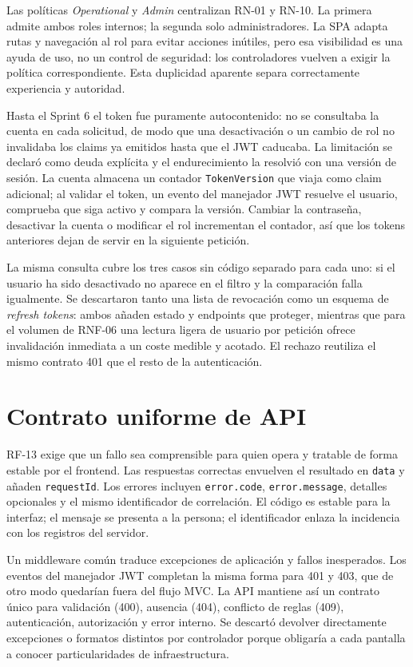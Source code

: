 Las políticas \emph{Operational} y \emph{Admin} centralizan RN-01 y RN-10. La primera admite ambos roles internos; la segunda solo administradores. La SPA adapta rutas y navegación al rol para evitar acciones inútiles, pero esa visibilidad es una ayuda de uso, no un control de seguridad: los controladores vuelven a exigir la política correspondiente. Esta duplicidad aparente separa correctamente experiencia y autoridad.

Hasta el Sprint 6 el token fue puramente autocontenido: no se consultaba la cuenta en cada solicitud, de modo que una desactivación o un cambio de rol no invalidaba los claims ya emitidos hasta que el JWT caducaba. La limitación se declaró como deuda explícita y el endurecimiento la resolvió con una versión de sesión. La cuenta almacena un contador \texttt{TokenVersion} que viaja como claim adicional; al validar el token, un evento del manejador JWT resuelve el usuario, comprueba que siga activo y compara la versión. Cambiar la contraseña, desactivar la cuenta o modificar el rol incrementan el contador, así que los tokens anteriores dejan de servir en la siguiente petición.

La misma consulta cubre los tres casos sin código separado para cada uno: si el usuario ha sido desactivado no aparece en el filtro y la comparación falla igualmente. Se descartaron tanto una lista de revocación como un esquema de \emph{refresh tokens}: ambos añaden estado y endpoints que proteger, mientras que para el volumen de RNF-06 una lectura ligera de usuario por petición ofrece invalidación inmediata a un coste medible y acotado. El rechazo reutiliza el mismo contrato 401 que el resto de la autenticación.

\section{Contrato uniforme de API}

RF-13 exige que un fallo sea comprensible para quien opera y tratable de forma estable por el frontend. Las respuestas correctas envuelven el resultado en \texttt{data} y añaden \texttt{requestId}. Los errores incluyen \texttt{error.code}, \texttt{error.message}, detalles opcionales y el mismo identificador de correlación. El código es estable para la interfaz; el mensaje se presenta a la persona; el identificador enlaza la incidencia con los registros del servidor.

Un middleware común traduce excepciones de aplicación y fallos inesperados. Los eventos del manejador JWT completan la misma forma para 401 y 403, que de otro modo quedarían fuera del flujo MVC. La API mantiene así un contrato único para validación (400), ausencia (404), conflicto de reglas (409), autenticación, autorización y error interno. Se descartó devolver directamente excepciones o formatos distintos por controlador porque obligaría a cada pantalla a conocer particularidades de infraestructura.

